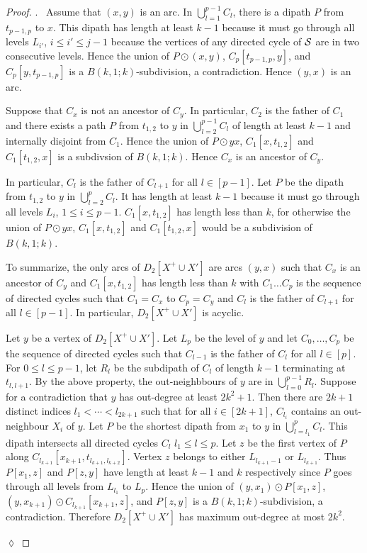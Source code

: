 \documentclass[utf8,10pt]{article}
\theoremstyle{plain}
\theoremstyle{definition}
\theoremstyle{remark}
\newenvironment{subproof}{\par\noindent {\it Subproof}.\ }{\hfill$\lozenge$\par\vspace{11pt}}
\begin{document}
\begin{proof}
\begin{subproof}
Assume that $(x,y)$ is an arc. In $\bigcup_{l=1}^{p-1} C_l$, there is a dipath $P$ from $t_{p-1,p}$ to $x$. This dipath has length at least $k-1$ because
it must go through all levels $L_{i'}$, $i\leq i'\leq j-1$ because the vertices of any directed cycle of ${\cal S}$ are in two consecutive levels.
Hence the union of $P\odot (x,y)$, $C_p[t_{p-1,p}, y]$, and  $C_p[y,t_{p-1,p}]$ is a $B(k,1;k)$-subdivision, a contradiction.
Hence  $(y,x)$ is an arc.


Suppose that $C_x$ is not an ancestor of $C_y$. In particular, $C_2$ is the father of $C_1$
and there exists a path $P$ from $t_{1,2}$ to $y$ in $\bigcup_{l=2}^{p-1} C_l$ of length at least $k-1$ and 
internally disjoint from $C_1$. Hence the union of $P \odot yx$, $C_1[x,t_{1,2}]$ and $C_1[t_{1,2},x]$ is a subdivsion of  $B(k,1;k)$.
Hence $C_x$ is an ancestor of $C_y$. 

In  particular, $C_l$ is the father of $C_{l+1}$ for all $l\in [p-1]$. Let $P$ be the dipath from $t_{1,2}$ 
to $y$ in $\bigcup_{l=2}^{p} C_l$. It has length at least $k-1$ because it must go through all levels $L_i$, $1\leq i\leq p-1$. 
$C_1[x,t_{1,2}]$ has length less than $k$, for otherwise the union of $P \odot yx$, $C_1[x,t_{1,2}]$ and $C_1[t_{1,2},x]$ would be a subdivision of  $B(k,1;k)$.

To summarize, the only arcs of $D_2[X^+\cup X']$ are arcs $(y,x)$ such that $C_x$ is an ancestor of $C_y$ and $C_1[x,t_{1,2}]$ has length less than $k$ with $C_1 \dots C_p$ is the
sequence of directed cycles such that $C_1=C_x$ to $C_p=C_y$ and $C_l$ is the father of $C_{l+1}$ for all $l\in [p-1]$.
In particular, $D_2[X^+\cup X']$ is acyclic.

Let $y$ be a vertex of $D_2[X^+\cup X']$.
Let $L_p$ be the level of $y$ and let $C_0, \dots, C_p$ be the sequence of directed cycles such that $C_{l-1}$ is the father of $C_l$ for all $l\in [p]$.
For $0\leq l\leq p-1$, let $R_l$ be the subdipath of $C_l$ of length $k-1$ terminating at $t_{l,l+1}$. By the above property, the out-neighbbours of
$y$ are in $\bigcup_{l=0}^{p-1} R_l$.
Suppose for a contradiction that $y$ has out-degree at least $2k^2+1$. Then there are $2k+1$ distinct indices $l_1 < \cdots < l_{2k+1}$ such that for all $i\in [2k+1]$,  $C_{l_i}$ contains an out-neighbour $X_i$ of $y$.
Let $P$ be the shortest dipath from $x_1$ to $y$ in $\bigcup_{l=l_1}^p C_l$. This dipath intersects all directed cycles $C_l$ $l_1\leq l\leq p$. Let $z$ be the first vertex of $P$ along $C_{l_{k+1}}[x_{k+1}, t_{l_{k+1}, l_{k+2}}]$. Vertex $z$ belongs to either $L_{l_{k+1}-1}$ or $L_{l_{k+1}}$.
Thus $P[x_1, z]$ and $P[z, y]$ have length at least $k-1$ and $k$ respectively since $P$ goes through all levels from $L_{l_1}$ to $L_p$. 
 Hence the union of $(y, x_1) \odot P[x_1, z]$,  $(y,x_{k+1})\odot C_{l_{k+1}}[x_{k+1},z]$, and
$P[z, y]$ is a $B(k,1;k)$-subdivision, a contradiction.
Therefore $D_2[X^+\cup X']$ has maximum out-degree at most $2k^2$. 


\end{subproof}
\end{proof}
\end{document}
